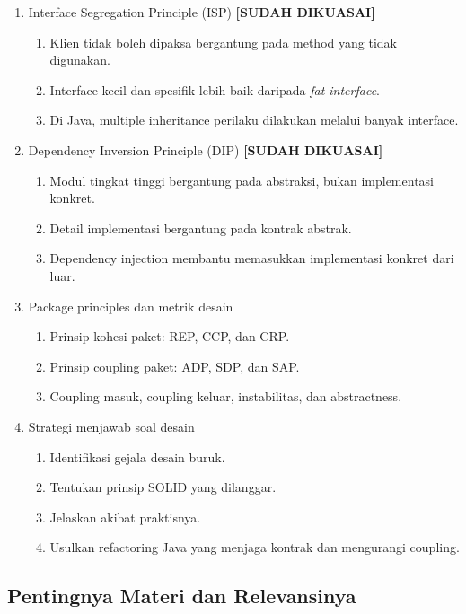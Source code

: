 \begin{enumerate}
    \item Interface Segregation Principle (ISP) \textbf{[SUDAH DIKUASAI]}
    \begin{enumerate}
        \item Klien tidak boleh dipaksa bergantung pada method yang tidak digunakan.
        \item Interface kecil dan spesifik lebih baik daripada \textit{fat interface}.
        \item Di Java, multiple inheritance perilaku dilakukan melalui banyak interface.
    \end{enumerate}
    \item Dependency Inversion Principle (DIP) \textbf{[SUDAH DIKUASAI]}
    \begin{enumerate}
        \item Modul tingkat tinggi bergantung pada abstraksi, bukan implementasi konkret.
        \item Detail implementasi bergantung pada kontrak abstrak.
        \item Dependency injection membantu memasukkan implementasi konkret dari luar.
    \end{enumerate}
    \item Package principles dan metrik desain
    \begin{enumerate}
        \item Prinsip kohesi paket: REP, CCP, dan CRP.
        \item Prinsip coupling paket: ADP, SDP, dan SAP.
        \item Coupling masuk, coupling keluar, instabilitas, dan abstractness.
    \end{enumerate}
    \item Strategi menjawab soal desain
    \begin{enumerate}
        \item Identifikasi gejala desain buruk.
        \item Tentukan prinsip SOLID yang dilanggar.
        \item Jelaskan akibat praktisnya.
        \item Usulkan refactoring Java yang menjaga kontrak dan mengurangi coupling.
    \end{enumerate}
\end{enumerate}

\subsection{Pentingnya Materi dan Relevansinya}

